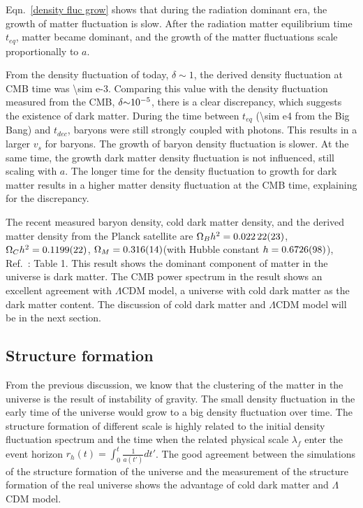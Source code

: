 Eqn.~\ref{density fluc grow} shows that during the radiation dominant era, the growth of matter fluctuation is slow. After the radiation matter equilibrium time $t_{eq}$, matter became dominant, and the growth of the matter fluctuations scale proportionally to $a$. 

From the density fluctuation of today, $\delta \sim 1$, the derived density fluctuation at CMB time was \num{\sim e-3}. Comparing this value with the density fluctuation measured from the CMB, $\delta \num{\sim e-5}$, there is a clear discrepancy, which suggests the existence of dark matter. During the time between $t_{eq}$ (\SI{\sim e4}{\yr} from the Big Bang) and $t_{dec}$, baryons were still strongly coupled with photons. This results in a larger $v_s$ for baryons. The growth of baryon density fluctuation is slower. At the same time, the growth dark matter density fluctuation is not influenced, still scaling with $a$. The longer time for the density fluctuation to growth for dark matter results in a higher matter density fluctuation at the CMB time, explaining for the discrepancy. 

The recent measured baryon density, cold dark matter density, and the derived matter density from the Planck satellite are $\Omega_B h^2= \num[separate-uncertainty=false]{0.02222 \pm 0.00023}$, $\Omega_C h^2 = \num[separate-uncertainty=false]{0.1199 \pm 0.0022}$, $\Omega_M = \num[separate-uncertainty=false]{0.316 \pm 0.014}$(with Hubble constant $h = \num[separate-uncertainty=false]{0.6726 \pm 0.0098}$), Ref.~\cite{Ade2016}: Table 1. This result shows the dominant component of matter in the universe is dark matter. The CMB power spectrum in the result shows an excellent agreement with $\Lambda$CDM model, a universe with cold dark matter as the dark matter content. The discussion of cold dark matter and $\Lambda$CDM model will be in the next section. 

\subsection{Structure formation}
From the previous discussion, we know that the clustering of the matter in the universe is the result of instability of gravity. The small density fluctuation in the early time of the universe would grow to a big density fluctuation over time. The structure formation of different scale is highly related to the initial density fluctuation spectrum and the time when the related physical scale $\lambda_f$ enter the event horizon $r_h(t)=\int_0^t \frac{1}{a(t')} dt'$. The good agreement between the simulations of the structure formation of the universe and the measurement of the structure formation of the real universe shows the advantage of cold dark matter and $\Lambda$CDM model.

